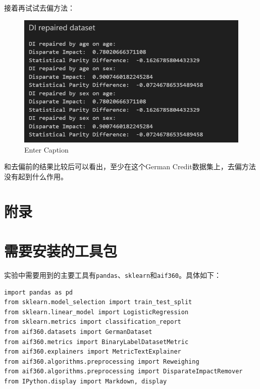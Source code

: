 \documentclass{article}
\begin{document}
接着再试试去偏方法：
\begin{figure}[h]
    \centering
    \includegraphics[width=0.58\linewidth]{img/image3.png}
    \caption{Enter Caption}
    \label{fig:enter-label}
\end{figure}

和去偏前的结果比较后可以看出，至少在这个German Credit数据集上，去偏方法没有起到什么作用。

\section*{附录}
\appendix

\section{需要安装的工具包}
实验中需要用到的主要工具有\lstinline{pandas}、\lstinline{sklearn}和\lstinline{aif360}。具体如下：
\begin{lstlisting}
import pandas as pd
from sklearn.model_selection import train_test_split
from sklearn.linear_model import LogisticRegression
from sklearn.metrics import classification_report
from aif360.datasets import GermanDataset
from aif360.metrics import BinaryLabelDatasetMetric
from aif360.explainers import MetricTextExplainer
from aif360.algorithms.preprocessing import Reweighing
from aif360.algorithms.preprocessing import DisparateImpactRemover
from IPython.display import Markdown, display
\end{lstlisting}
\end{document}

